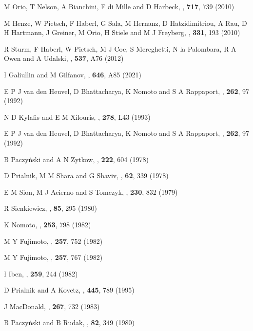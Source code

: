 \begin{thebibliography}{100}
	M Orio, T Nelson, A Bianchini, F di Mille and D Harbeck, \textit{\ApJ}, \textbf{717}, 739 (2010)

	M Henze, W Pietsch, F Haberl, G Sala, M Hernanz, D Hatzidimitriou, A Rau, D H Hartmann, J Greiner, M Orio, H Stiele and M J Freyberg, \textit{\ANAN}, \textbf{331}, 193 (2010)

	R Sturm, F Haberl, W Pietsch, M J Coe, S Mereghetti, N la Palombara,
R A Owen and A Udalski, \textit{\AnA}, \textbf{537}, A76 (2012)

	I Galiullin and M Gilfanov, \textit{\AnA}, \textbf{646}, A85 (2021)
	
	E P J van den Heuvel, D Bhattacharya, K Nomoto and S A Rappaport, \textit{\AnA}, \textbf{262}, 97 (1992)
	
	N D Kylafis and E M Xilouris, \textit{\AnA}, \textbf{278}, L43 (1993)

	E P J van den Heuvel, D Bhattacharya, K Nomoto and S A Rappaport, \textit{\AnA}, \textbf{262}, 97 (1992)
	
	B Paczy{\'n}ski and A N Zytkow, \textit{\ApJ}, \textbf{222}, 604 (1978)
	
	D Prialnik, M M Shara and G Shaviv, \textit{\AnA}, \textbf{62}, 339 (1978)

	E M Sion, M J Acierno and S Tomczyk, \textit{\ApJ}, \textbf{230}, 832 (1979)

	R Sienkiewicz, \textit{\AnA}, \textbf{85}, 295 (1980)
	
	K Nomoto, \textit{\ApJ}, \textbf{253}, 798 (1982)
	
	M Y Fujimoto, \textit{\ApJ}, \textbf{257}, 752 (1982)
	
	M Y Fujimoto, \textit{\ApJ}, \textbf{257}, 767 (1982)
	
	I Iben, \textit{\ApJ}, \textbf{259}, 244 (1982)

	D Prialnik and A Kovetz, \textit{\ApJ}, \textbf{445}, 789 (1995)
	
	J MacDonald, \textit{\ApJ}, \textbf{267}, 732 (1983)
	
	B Paczy{\'n}ski and B Rudak, \textit{\AnA}, \textbf{82}, 349 (1980)
	

\end{thebibliography}
